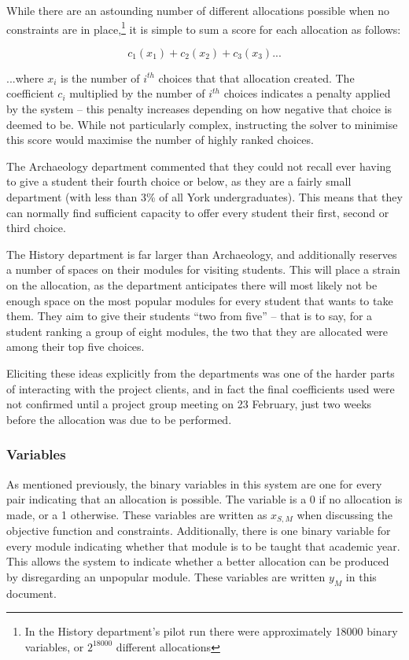 While there are an astounding number of different allocations possible when no
constraints are in place,\footnote{In the History department's pilot run there
were approximately 18000 binary variables, or $2^{18000}$ different
allocations} it is simple to sum a score for each allocation as
follows:\mynobreakpar

$$
c_1(x_1) + c_2(x_2) + c_3(x_3) ...
$$

...where $x_i$ is the number of $i^{th}$ choices that that allocation created.
The coefficient $c_i$ multiplied by the number of $i^{th}$ choices indicates a
penalty applied by the system -- this penalty increases depending on how
negative that choice is deemed to be. While not particularly complex,
instructing the solver to minimise this score would maximise the number of
highly ranked choices.

The Archaeology department commented that they could not recall ever having to
give a student their fourth choice or below, as they are a fairly small
department (with less than 3\% of all York undergraduates). This means that
they can normally find sufficient capacity to offer every student their first,
second or third choice.

The History department is far larger than Archaeology, and additionally
reserves a number of spaces on their modules for visiting students. This will
place a strain on the allocation, as the department anticipates there will
most likely not be enough space on the most popular modules for every student
that wants to take them. They aim to give their students ``two from five'' --
that is to say, for a student ranking a group of eight modules, the two that
they are allocated were among their top five choices.

Eliciting these ideas explicitly from the departments was one of the harder
parts of interacting with the project clients, and in fact the final
coefficients used were not confirmed until a project group meeting on 23
February, just two weeks before the allocation was due to be performed.

\subsubsection{Variables}

As mentioned previously, the binary variables in this system are one for every
\studmod pair indicating that an allocation is possible. The variable is a 0
if no allocation is made, or a 1 otherwise. These variables are written as
$x_{S,M}$ when discussing the objective function and constraints.
Additionally, there is one binary variable for every module indicating whether
that module is to be taught that academic year. This allows the system to
indicate whether a better allocation can be produced by disregarding an
unpopular module. These variables are written $y_{M}$ in this document.

